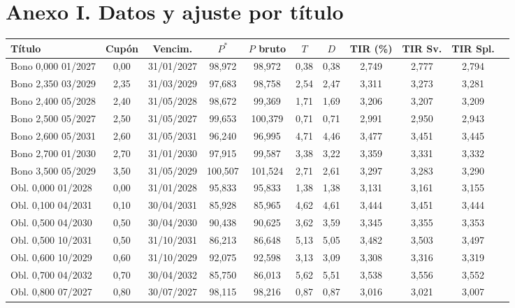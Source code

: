 \documentclass[a4paper,12pt]{article}
\begin{document}
\section*{Anexo I. Datos y ajuste por título}
\scriptsize\setlength{\tabcolsep}{2.5pt}
\begin{longtable}{lcccccccccc}
\toprule Título & Cupón & Vencim. & $P^*$ & $P$ bruto & $T$ & $D$ & TIR (\%) & TIR Sv. & TIR Spl.\\\midrule\endhead
Bono 0,000 01/2027 & 0{,}00 & 31/01/2027 & 98{,}972 & 98{,}972 & 0{,}38 & 0{,}38 & 2{,}749 & 2{,}777 & 2{,}794 \\
Bono 2,350 03/2029 & 2{,}35 & 31/03/2029 & 97{,}683 & 98{,}758 & 2{,}54 & 2{,}47 & 3{,}311 & 3{,}273 & 3{,}281 \\
Bono 2,400 05/2028 & 2{,}40 & 31/05/2028 & 98{,}672 & 99{,}369 & 1{,}71 & 1{,}69 & 3{,}206 & 3{,}207 & 3{,}209 \\
Bono 2,500 05/2027 & 2{,}50 & 31/05/2027 & 99{,}653 & 100{,}379 & 0{,}71 & 0{,}71 & 2{,}991 & 2{,}950 & 2{,}943 \\
Bono 2,600 05/2031 & 2{,}60 & 31/05/2031 & 96{,}240 & 96{,}995 & 4{,}71 & 4{,}46 & 3{,}477 & 3{,}451 & 3{,}445 \\
Bono 2,700 01/2030 & 2{,}70 & 31/01/2030 & 97{,}915 & 99{,}587 & 3{,}38 & 3{,}22 & 3{,}359 & 3{,}331 & 3{,}332 \\
Bono 3,500 05/2029 & 3{,}50 & 31/05/2029 & 100{,}507 & 101{,}524 & 2{,}71 & 2{,}61 & 3{,}297 & 3{,}283 & 3{,}290 \\
Obl. 0,000 01/2028 & 0{,}00 & 31/01/2028 & 95{,}833 & 95{,}833 & 1{,}38 & 1{,}38 & 3{,}131 & 3{,}161 & 3{,}155 \\
Obl. 0,100 04/2031 & 0{,}10 & 30/04/2031 & 85{,}928 & 85{,}965 & 4{,}62 & 4{,}61 & 3{,}444 & 3{,}451 & 3{,}444 \\
Obl. 0,500 04/2030 & 0{,}50 & 30/04/2030 & 90{,}438 & 90{,}625 & 3{,}62 & 3{,}59 & 3{,}345 & 3{,}355 & 3{,}353 \\
Obl. 0,500 10/2031 & 0{,}50 & 31/10/2031 & 86{,}213 & 86{,}648 & 5{,}13 & 5{,}05 & 3{,}482 & 3{,}503 & 3{,}497 \\
Obl. 0,600 10/2029 & 0{,}60 & 31/10/2029 & 92{,}075 & 92{,}598 & 3{,}13 & 3{,}09 & 3{,}308 & 3{,}316 & 3{,}319 \\
Obl. 0,700 04/2032 & 0{,}70 & 30/04/2032 & 85{,}750 & 86{,}013 & 5{,}62 & 5{,}51 & 3{,}538 & 3{,}556 & 3{,}552 \\
Obl. 0,800 07/2027 & 0{,}80 & 30/07/2027 & 98{,}115 & 98{,}216 & 0{,}87 & 0{,}87 & 3{,}016 & 3{,}021 & 3{,}007 \\

\end{longtable}
\end{document}
